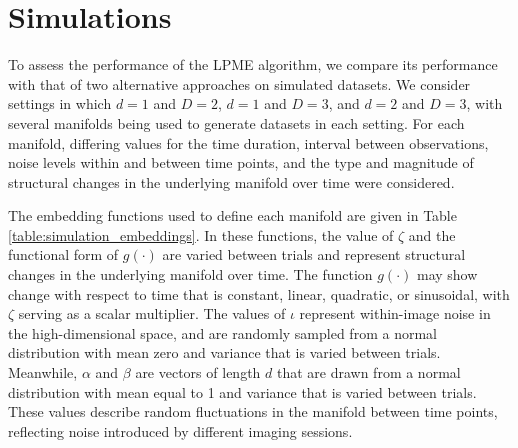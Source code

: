 \documentclass[11pt,reqno]{article}
\theoremstyle{definition}
\begin{document}
\section{Simulations}

To assess the performance of the LPME algorithm, we compare its performance with that of two alternative approaches on simulated datasets. We consider settings in which $d = 1$ and $D = 2$, $d = 1$ and $D = 3$, and $d = 2$ and $D = 3$, with several manifolds being used to generate datasets in each setting. For each manifold, differing values for the time duration, interval between observations, noise levels within and between time points, and the type and magnitude of structural changes in the underlying manifold over time were considered. 

The embedding functions used to define each manifold are given in Table \ref{table:simulation_embeddings}. In these functions, the value of $\zeta$ and the functional form of $g(\cdot)$ are varied between trials and represent structural changes in the underlying manifold over time. The function $g(\cdot)$ may show change with respect to time that is constant, linear, quadratic, or sinusoidal, with $\zeta$ serving as a scalar multiplier. The values of $\iota$ represent within-image noise in the high-dimensional space, and are randomly sampled from a normal distribution with mean zero and variance that is varied between trials. Meanwhile, $\alpha$ and $\beta$ are vectors of length $d$ that are drawn from a normal distribution with mean equal to 1 and variance that is varied between trials. These values describe random fluctuations in the manifold between time points, reflecting noise introduced by different imaging sessions.
\end{document}
